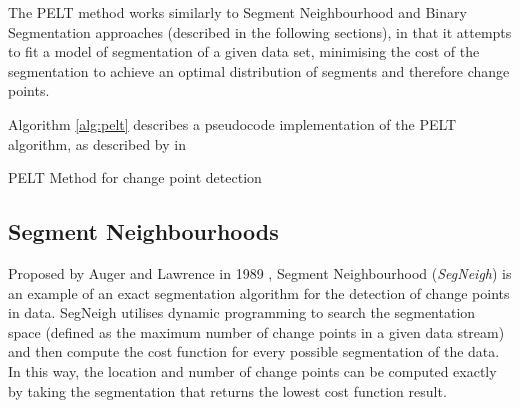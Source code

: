 \documentclass[../main.tex]{subfiles}
\begin{document}
The PELT method works similarly to Segment Neighbourhood \cite{Auger1989} and Binary Segmentation \cite{Jackson2003, Yao1984} approaches (described in the following sections), in that it attempts to fit a model of segmentation of a given data set, minimising the cost of the segmentation to achieve an optimal distribution of segments and therefore change points.

Algorithm \autoref{alg:pelt} describes a pseudocode implementation of the PELT algorithm, as described by \citeauthor{Eckley2011} in  \cite{Eckley2011}\newline

\begin{algorithm}[H]
    \label{alg:pelt}
    \caption{PELT Method for change point detection}
    \DontPrintSemicolon
    \bigskip
\end{algorithm}

\subsection{Segment Neighbourhoods}

Proposed by Auger and Lawrence in 1989 \cite{Auger1989}, Segment Neighbourhood (\emph{SegNeigh}) is an example of an exact segmentation algorithm for the detection of change points in data. SegNeigh utilises dynamic programming to search the segmentation space (defined as the maximum number of change points in a given data stream) and then compute the cost function for every possible segmentation of the data. In this way, the location and number of change points can be computed exactly by taking the segmentation that returns the lowest cost function result.
\end{document}
